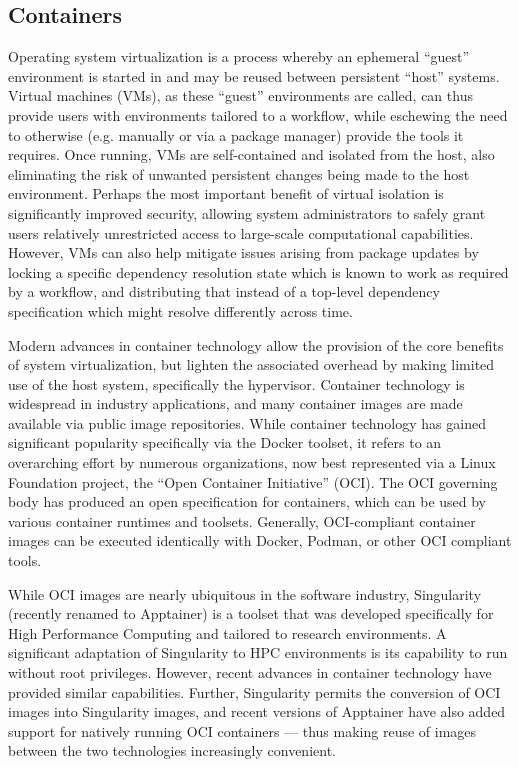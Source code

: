 \subsection{Containers}

Operating system virtualization is a process whereby an ephemeral “guest” environment is started in and may be reused between persistent “host” systems.
Virtual machines (VMs), as these “guest” environments are called, can thus provide users with environments tailored to a workflow, while eschewing the need to otherwise (e.g. manually or via a package manager) provide the tools it requires.
Once running, VMs are self-contained and isolated from the host, also eliminating the risk of unwanted persistent changes being made to the host environment.
Perhaps the most important benefit of virtual isolation is significantly improved security, allowing system administrators to safely grant users relatively unrestricted access to large-scale computational capabilities.
However, VMs can also help mitigate issues arising from package updates by locking a specific dependency resolution state which is known to work as required by a workflow, and distributing that instead of a top-level dependency specification which might resolve differently across time.

Modern advances in container technology allow the provision of the core benefits of system virtualization, but lighten the associated overhead by making limited use of the host system, specifically the hypervisor.
Container technology is widespread in industry applications, and many container images are made available via public image repositories.
While container technology has gained significant popularity specifically via the Docker toolset, it refers to an overarching effort by numerous organizations, now best represented via a Linux Foundation project, the “Open Container Initiative” (OCI).
The OCI governing body has produced an open specification for containers, which can be used by various container runtimes and toolsets.
Generally, OCI-compliant container images can be executed identically with Docker, Podman, or other OCI compliant tools.

While OCI images are nearly ubiquitous in the software industry, Singularity (recently renamed to Apptainer) is a toolset that was developed specifically for High Performance Computing and tailored to research environments.
A significant adaptation of Singularity to HPC environments is its capability to run without root privileges.
However, recent advances in container technology have provided similar capabilities.
Further, Singularity permits the conversion of OCI images into Singularity images, and recent versions of Apptainer have also added support for natively running OCI containers — thus making reuse of images between the two technologies increasingly convenient.

